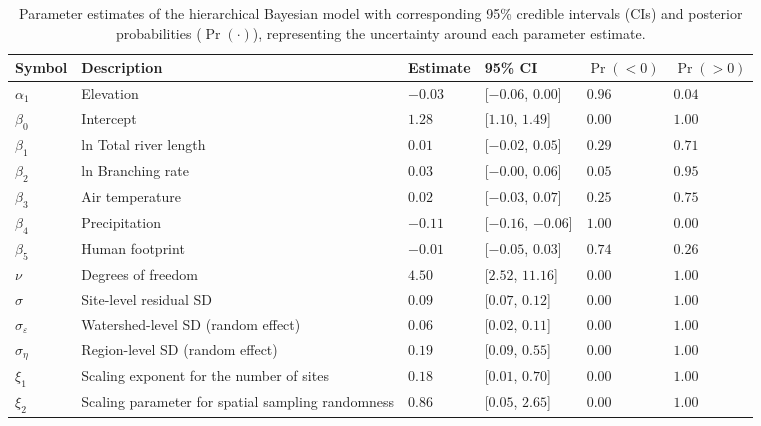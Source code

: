 \begin{table}[ht]
\centering
\caption{Parameter estimates of the hierarchical Bayesian model 
             with corresponding 95\% credible intervals (CIs) and 
             posterior probabilities ($\Pr(\cdot)$), 
             representing the uncertainty around each parameter estimate.} 
\label{tab:parms-est}
\begingroup\small
\begin{tabularx}{\textwidth}{llllll}
  \hline
Symbol & Description & Estimate & 95\% CI & $\Pr(< 0)$ & $\Pr(> 0)$ \\ 
  \hline
$\alpha_1$ & Elevation & $-0.03$ & [$-0.06$, $0.00$] & $0.96$ & $0.04$ \\ 
  $\beta_0$ & Intercept & $1.28$ & [$1.10$, $1.49$] & $0.00$ & $1.00$ \\ 
  $\beta_1$ & ln Total river length & $0.01$ & [$-0.02$, $0.05$] & $0.29$ & $0.71$ \\ 
  $\beta_2$ & ln Branching rate & $0.03$ & [$-0.00$, $0.06$] & $0.05$ & $0.95$ \\ 
  $\beta_3$ & Air temperature & $0.02$ & [$-0.03$, $0.07$] & $0.25$ & $0.75$ \\ 
  $\beta_4$ & Precipitation & $-0.11$ & [$-0.16$, $-0.06$] & $1.00$ & $0.00$ \\ 
  $\beta_5$ & Human footprint & $-0.01$ & [$-0.05$, $0.03$] & $0.74$ & $0.26$ \\ 
  $\nu$ & Degrees of freedom & $4.50$ & [$2.52$, $11.16$] & $0.00$ & $1.00$ \\ 
  $\sigma$ & Site-level residual SD & $0.09$ & [$0.07$, $0.12$] & $0.00$ & $1.00$ \\ 
  $\sigma_{\varepsilon}$ & Watershed-level SD (random effect) & $0.06$ & [$0.02$, $0.11$] & $0.00$ & $1.00$ \\ 
  $\sigma_{\eta}$ & Region-level SD (random effect) & $0.19$ & [$0.09$, $0.55$] & $0.00$ & $1.00$ \\ 
  $\xi_{1}$ & Scaling exponent for the number of sites & $0.18$ & [$0.01$, $0.70$] & $0.00$ & $1.00$ \\ 
  $\xi_{2}$ & Scaling parameter for spatial sampling randomness & $0.86$ & [$0.05$, $2.65$] & $0.00$ & $1.00$ \\ 
   \hline
\end{tabularx}
\endgroup
\end{table}
